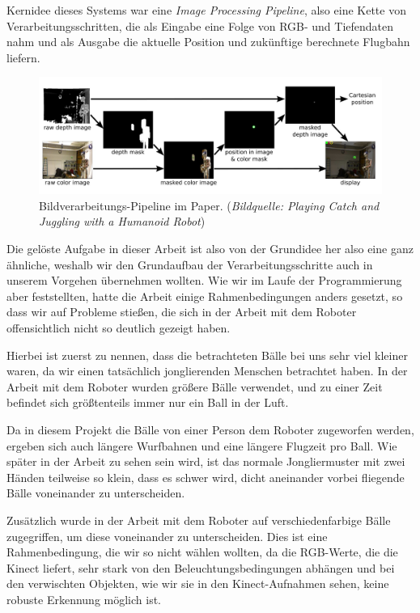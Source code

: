 \documentclass[12pt,a4paper,ngerman]{scrartcl}
\begin{document}
Kernidee dieses Systems war eine \textit{Image Processing Pipeline}, also eine
Kette von Verarbeitungsschritten, die als Eingabe eine Folge von RGB- und Tiefendaten
nahm und als Ausgabe die aktuelle Position und zukünftige berechnete Flugbahn
liefern.

\begin{figure}[H]
    \centering
    \includegraphics[scale=0.31]{img/koberpipeline.jpg}
    \caption{Bildverarbeitungs-Pipeline im Paper. ({\em Bildquelle: Playing Catch and Juggling with a Humanoid Robot\cite{kober}})}
    \label{koberpipeline}
\end{figure}

Die gelöste Aufgabe in dieser Arbeit ist also von der Grundidee her also eine ganz
ähnliche, weshalb wir den Grundaufbau der Verarbeitungsschritte auch in unserem
Vorgehen übernehmen wollten. Wie wir im Laufe der Programmierung aber feststellten,
hatte die Arbeit einige Rahmenbedingungen anders gesetzt, so dass wir auf Probleme
stießen, die sich in der Arbeit mit dem Roboter offensichtlich nicht so deutlich
gezeigt haben.

Hierbei ist zuerst zu nennen, dass die betrachteten Bälle bei uns sehr viel kleiner
waren, da wir einen tatsächlich jonglierenden Menschen betrachtet haben. In der
Arbeit mit dem Roboter wurden größere Bälle verwendet, und zu einer Zeit befindet
sich größtenteils immer nur ein Ball in der Luft.

Da in diesem Projekt die Bälle von einer Person dem Roboter zugeworfen werden,
ergeben sich auch längere Wurfbahnen und eine längere Flugzeit pro Ball. Wie
später in der Arbeit zu sehen sein wird, ist das normale Jongliermuster mit zwei
Händen teilweise so klein, dass es schwer wird, dicht aneinander vorbei fliegende
Bälle voneinander zu unterscheiden.

Zusätzlich wurde in der Arbeit mit dem Roboter auf verschiedenfarbige Bälle
zugegriffen, um diese voneinander zu unterscheiden. Dies ist eine Rahmenbedingung,
die wir so nicht wählen wollten, da die RGB-Werte, die die Kinect liefert, sehr stark
von den Beleuchtungsbedingungen abhängen und bei den verwischten Objekten, wie
wir sie in den Kinect-Aufnahmen sehen, keine robuste Erkennung möglich ist.
\end{document}
